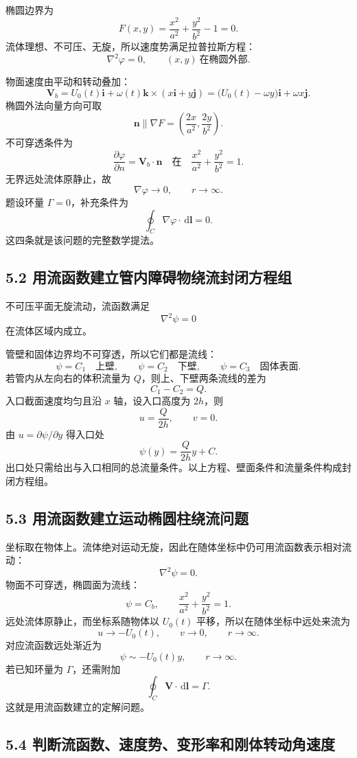 ﻿\documentclass[UTF8,zihao=-4]{ctexart}
\newcommand{\dd}{\,\mathrm d}
\begin{document}
椭圆边界为
\[
F(x,y)=\frac{x^2}{a^2}+\frac{y^2}{b^2}-1=0 .
\]
流体理想、不可压、无旋，所以速度势满足拉普拉斯方程：
\[
\nabla^2\varphi=0,\qquad (x,y)\ \text{在椭圆外部}.
\]

物面速度由平动和转动叠加：
\[
\bm V_b=U_0(t)\bm i+\omega(t)\bm k\times (x\bm i+y\bm j)
=\bigl(U_0(t)-\omega y\bigr)\bm i+\omega x\bm j .
\]
椭圆外法向量方向可取
\[
\bm n \parallel \nabla F=\left(\frac{2x}{a^2},\frac{2y}{b^2}\right).
\]
不可穿透条件为
\[
\frac{\partial \varphi}{\partial n}=\bm V_b\cdot \bm n
\quad \text{在}\quad \frac{x^2}{a^2}+\frac{y^2}{b^2}=1.
\]
无界远处流体原静止，故
\[
\nabla\varphi\to 0,\qquad r\to\infty .
\]
题设环量 \(\Gamma=0\)，补充条件为
\[
\oint_C \nabla\varphi\cdot \dd\bm l=0 .
\]
这四条就是该问题的完整数学提法。

\subsection*{5.2 用流函数建立管内障碍物绕流封闭方程组}

不可压平面无旋流动，流函数满足
\[
\nabla^2\psi=0
\]
在流体区域内成立。

管壁和固体边界均不可穿透，所以它们都是流线：
\[
\psi=C_1\quad \text{上壁},\qquad
\psi=C_2\quad \text{下壁},\qquad
\psi=C_3\quad \text{固体表面}.
\]
若管内从左向右的体积流量为 \(Q\)，则上、下壁两条流线的差为
\[
C_1-C_2=Q .
\]
入口截面速度均匀且沿 \(x\) 轴，设入口高度为 \(2h\)，则
\[
u=\frac{Q}{2h},\qquad v=0 .
\]
由 \(u=\partial\psi/\partial y\) 得入口处
\[
\psi(y)=\frac{Q}{2h}y+C .
\]
出口处只需给出与入口相同的总流量条件。以上方程、壁面条件和流量条件构成封闭方程组。

\subsection*{5.3 用流函数建立运动椭圆柱绕流问题}

坐标取在物体上。流体绝对运动无旋，因此在随体坐标中仍可用流函数表示相对流动：
\[
\nabla^2\psi=0 .
\]
物面不可穿透，椭圆面为流线：
\[
\psi=C_b,\qquad \frac{x^2}{a^2}+\frac{y^2}{b^2}=1 .
\]
远处流体原静止，而坐标系随物体以 \(U_0(t)\) 平移，所以在随体坐标中远处来流为
\[
u\to -U_0(t),\qquad v\to 0,\qquad r\to\infty .
\]
对应流函数远处渐近为
\[
\psi\sim -U_0(t)y,\qquad r\to\infty .
\]
若已知环量为 \(\Gamma\)，还需附加
\[
\oint_C \bm V\cdot \dd\bm l=\Gamma .
\]
这就是用流函数建立的定解问题。

\subsection*{5.4 判断流函数、速度势、变形率和刚体转动角速度}
\end{document}
